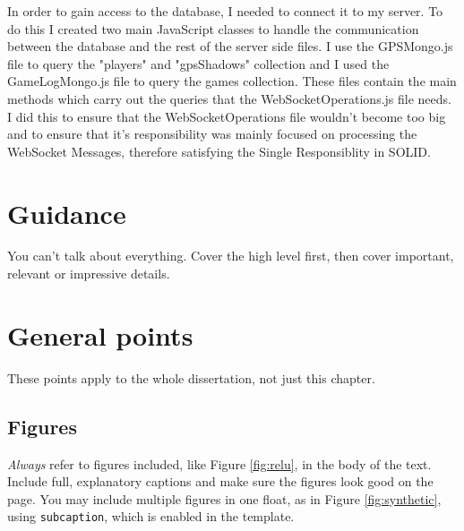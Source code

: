 \documentclass{l4proj}
\begin{document}
In order to gain access to the database, I needed to connect it to my server. To do this I created two main JavaScript classes to handle the
communication between the database and the rest of the server side files. I use the GPSMongo.js file to query the "players" and "gpsShadows"
collection and I used the GameLogMongo.js file to query the games collection. These files contain the main methods which carry out the queries
that the WebSocketOperations.js file needs. I did this to ensure that the WebSocketOperations file wouldn't become too big and to ensure that
it's responsibility was mainly focused on processing the WebSocket Messages, therefore satisfying the Single Responsiblity in SOLID.


\section{Guidance}
You can't talk about everything. Cover the high level first, then cover important, relevant or impressive details.



\section{General points}

These points apply to the whole dissertation, not just this chapter.



\subsection{Figures}
\emph{Always} refer to figures included, like Figure \ref{fig:relu}, in the body of the text. Include full, explanatory captions and make sure the figures look good on the page.
You may include multiple figures in one float, as in Figure \ref{fig:synthetic}, using \texttt{subcaption}, which is enabled in the template.
\end{document}
